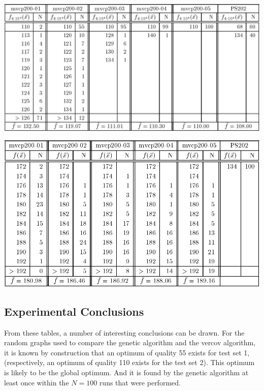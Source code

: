 \documentclass[12pt]{article}
\begin{document}
\begin{table}[!htbp]
\centering
\includegraphics[width=1\textwidth]{t3}
\caption{%
Experimental results obtained by the genetic algorithm for five random graphs of size $n = 200$ with edge density: $d = 0.1$ (``mvcp200-01''), $d = 0.2$ (``mvcp200-02''), $d = 0.3$ (``mvcp200-03''), $d = 0.5$ (``mvcp200-04''), $d = 0.5$ (``mvcp200-05'') and the regular graph of size $n = 202 \ (k=66)$ from Papadimitriou and Steiglitz (``PS202'').%
}
\label{tbl:t3}
\end{table}

\begin{table}[!htbp]
\centering
\includegraphics[width=1\textwidth]{t4}
\caption{%
Experimental results obtained by the vercov algorithm for five random graphs of size $n = 200$ with edge density: $d = 0.1$ (``mvcp200-01''), $d = 0.2$ (``mvcp200-02''), $d = 0.3$ (``mvcp200-03''), $d = 0.5$ (``mvcp200-04''), $d = 0.5$ (``mvcp200-05'') and the regular graph of size $n = 202 \ (k=66)$ from Papadimitriou and Steiglitz (``PS202'').%
}
\label{tbl:t4}
\end{table}


\subsection{Experimental Conclusions}
From these tables, a number of interesting conclusions
can be drawn.
For the random graphs used to compare the
genetic algorithm and the vercov algorithm,
it is known by construction that an optimum of
quality 55 exists for test set 1,
(respectively, an optimum of quality 110 exists
for the test set 2).
This optimum is likely to be the global optimum.
And it is found by the genetic algorithm at least once
within the $N = 100$ runs that were performed.
\end{document}
